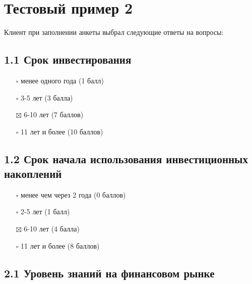 \documentclass[11pt]{article}
\providecommand{\tightlist}{%
      \setlength{\itemsep}{0pt}\setlength{\parskip}{0pt}}
\begin{document}
    \section{Тестовый пример
2}\label{ux442ux435ux441ux442ux43eux432ux44bux439-ux43fux440ux438ux43cux435ux440-2}

Клиент при заполнении анкеты выбрал следующие ответы на вопросы:

\subsection{1.1 Срок
инвестирования}\label{ux441ux440ux43eux43a-ux438ux43dux432ux435ux441ux442ux438ux440ux43eux432ux430ux43dux438ux44f}

\begin{itemize}
\tightlist
\item[$\square$]
  менее одного года (1 балл)
\item[$\square$]
  3-5 лет (3 балла)
\item[$\boxtimes$]
  6-10 лет (7 баллов)
\item[$\square$]
  11 лет и более (10 баллов)
\end{itemize}

\subsection{1.2 Срок начала использования инвестиционных
накоплений}\label{ux441ux440ux43eux43a-ux43dux430ux447ux430ux43bux430-ux438ux441ux43fux43eux43bux44cux437ux43eux432ux430ux43dux438ux44f-ux438ux43dux432ux435ux441ux442ux438ux446ux438ux43eux43dux43dux44bux445-ux43dux430ux43aux43eux43fux43bux435ux43dux438ux439}

\begin{itemize}
\tightlist
\item[$\square$]
  менее чем через 2 года (0 баллов)
\item[$\square$]
  2-5 лет (1 балл)
\item[$\boxtimes$]
  6-10 лет (4 балла)
\item[$\square$]
  11 лет и более (8 баллов)
\end{itemize}

\subsection{2.1 Уровень знаний на финансовом
рынке}\label{ux443ux440ux43eux432ux435ux43dux44c-ux437ux43dux430ux43dux438ux439-ux43dux430-ux444ux438ux43dux430ux43dux441ux43eux432ux43eux43c-ux440ux44bux43dux43aux435}
\end{document}
